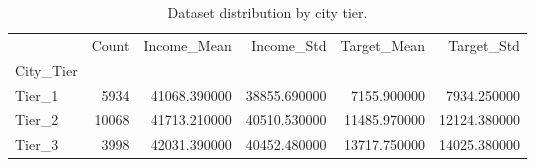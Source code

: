\begin{table}
\caption{Dataset distribution by city tier.}
\label{tab:city-tier}
\begin{tabular}{lrrrrr}
\toprule
 & Count & Income\_Mean & Income\_Std & Target\_Mean & Target\_Std \\
City_Tier &  &  &  &  &  \\
\midrule
Tier\_1 & 5934 & 41068.390000 & 38855.690000 & 7155.900000 & 7934.250000 \\
Tier\_2 & 10068 & 41713.210000 & 40510.530000 & 11485.970000 & 12124.380000 \\
Tier\_3 & 3998 & 42031.390000 & 40452.480000 & 13717.750000 & 14025.380000 \\
\bottomrule
\end{tabular}
\end{table}
